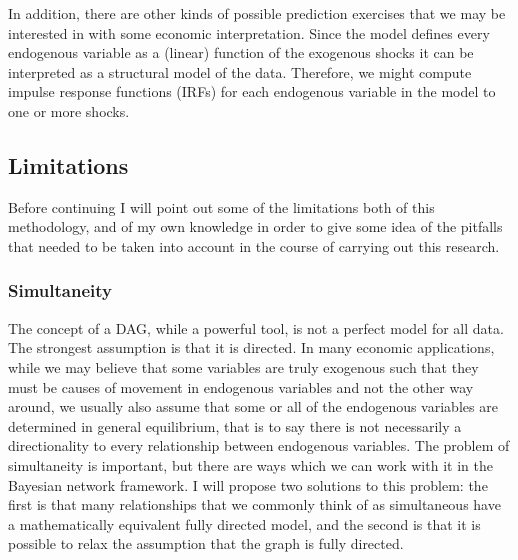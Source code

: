 \documentclass{article}
\begin{document}
In addition, there are other kinds of possible prediction exercises that we may be interested in with some economic interpretation. Since the model defines every endogenous variable as a (linear) function of the exogenous shocks it can be interpreted as a structural model of the data. Therefore, we might compute impulse response functions (IRFs) for each endogenous variable in the model to one or more shocks.

\subsection{Limitations}

Before continuing I will point out some of the limitations both of this methodology, and of my own knowledge in order to give some idea of the pitfalls that needed to be taken into account in the course of carrying out this research.

\subsubsection{Simultaneity}

The concept of a DAG, while a powerful tool, is not a perfect model for all data. The strongest assumption is that it is directed. In many economic applications, while we may believe that some variables are truly exogenous such that they must be causes of movement in endogenous variables and not the other way around, we usually also assume that some or all of the endogenous variables are determined in general equilibrium, that is to say there is not necessarily a directionality to every relationship between endogenous variables. The problem of simultaneity is important, but there are ways which we can work with it in the Bayesian network framework. I will propose two solutions to this problem: the first is that many relationships that we commonly think of as simultaneous have a mathematically equivalent fully directed model, and the second is that it is possible to relax the assumption that the graph is fully directed.
\end{document}
